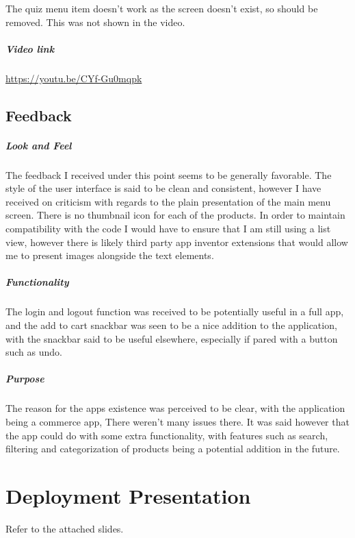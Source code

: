 \documentclass{scrreprt}
\begin{document}
The quiz menu item doesn't work as the screen doesn't exist, so should be removed. This was not shown in the video.

\paragraph{Video link}

\url{https://youtu.be/CYf-Gu0mqpk}

\section{Feedback}

\paragraph{Look and Feel}

The feedback I received under this point seems to be generally favorable. The style of the user interface is said to be clean and consistent, however I have received on criticism with regards to the plain presentation of the main menu screen. There is no thumbnail icon for each of the products. In order to maintain compatibility with the code I would have to ensure that I am still using a list view, however there is likely third party app inventor extensions that would allow me to present images alongside the text elements.

\paragraph{Functionality}

The login and logout function was received to be potentially useful in a full app, and the add to cart snackbar was seen to be a nice addition to the application, with the snackbar said to be useful elsewhere, especially if pared with a button such as undo.

\paragraph{Purpose}

The reason for the apps existence was perceived to be clear, with the application being a commerce app, There weren't many issues there. It was said however that the app could do with some extra functionality, with features such as search, filtering and categorization of products being a potential addition in the future.

\chapter{Deployment Presentation}\label{deployment}

Refer to the attached slides.

\printbibliography
\end{document}
